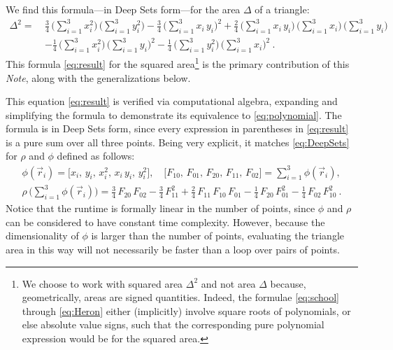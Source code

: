 \documentclass[10pt]{article}
\newcommand{\documentname}{\textsl{Note}}
\newcommand{\secbreak}{\bigskip{\centering\footnotesize $\triangle~~~\triangle~~~\triangle$\par}\bigskip\noindent}
\begin{document}
\secbreak
We find this formula---in Deep Sets form---for the area $\Delta$ of a triangle:
\begin{align}
    \Delta^2 = \ &
    \frac{3}{4}
        \,\big( \sum_{i=1}^{3} x_i^2 \big)
        \,\big( \sum_{i=1}^{3} y_i^2 \big)
    - \frac{3}{4}
        \,\big( \sum_{i=1}^{3} x_i \, y_i \big)^2 
    + \frac{2}{4}
        \,\big( \sum_{i=1}^{3} x_i \, y_i \big)
        \,\big( \sum_{i=1}^{3} x_i \big)
        \,\big( \sum_{i=1}^{3} y_i \big)
    \nonumber\\ &
    - \frac{1}{4}
        \,\big( \sum_{i=1}^{3} x_i^2 \big)
        \,\big( \sum_{i=1}^{3} y_i \big)^2
    - \frac{1}{4}
        \,\big( \sum_{i=1}^{3} y_i^2 \big)
        \,\big( \sum_{i=1}^{3} x_i \big)^2
     ~.
\label{eq:result}
\end{align}
This formula \eqref{eq:result} for the squared area\footnote{%
    We choose to work with squared area $\Delta^2$ and not area $\Delta$ because, geometrically, areas are signed quantities.
    Indeed, the formulae \eqref{eq:school} through \eqref{eq:Heron} either (implicitly) involve square roots of polynomials, or else absolute value signs, such that the corresponding pure polynomial expression would be for the squared area.}
is the primary contribution of this \documentname, along with the generalizations below.

This equation \eqref{eq:result} is verified via computational algebra, expanding and simplifying the formula to demonstrate its equivalence to \eqref{eq:polynomial}.
The formula is in Deep Sets form, since
every expression in parentheses in \eqref{eq:result} is a pure sum over all three points.
Being very explicit, it matches \eqref{eq:DeepSets} for $\rho$ and $\phi$ defined as follows:
\begin{gather}
    \label{eq:resultDeepSets}
    \phi(\vec{r}_i) = \big[
        x_i, \,
        y_i, \,
        x_i^2, \,
        x_i \, y_i, \,
        y_i^2
    \big], \quad
    \big[
        F_{10}, \,
        F_{01}, \,
        F_{20}, \,
        F_{11}, \,
        F_{02}
    \big] = \sum_{i=1}^{3} \phi(\vec{r}_i),
    \\
    \rho \, \big( \sum_{i=1}^{3} \phi(\vec{r}_i) \big)
    = \frac{3}{4} \, F_{20} \, F_{02}
    - \frac{3}{4} \, F_{11}^2
    + \frac{2}{4} \, F_{11} \, F_{10} \, F_{01}
    - \frac{1}{4} \, F_{20} \, F_{01}^2
    - \frac{1}{4} \, F_{02} \, F_{10}^2~.
    \nonumber
\end{gather}
Notice that the runtime is formally linear in the number of points, since $\phi$ and $\rho$ can be considered to have constant time complexity.
However, because the dimensionality of $\phi$ is larger than the number of points, evaluating the triangle area in this way will not necessarily be faster than a loop over pairs of points.
\end{document}
